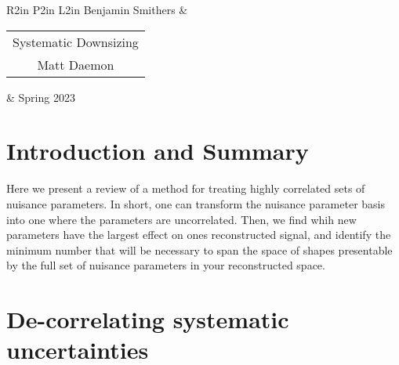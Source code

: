 \documentclass[12pt,a4paper]{article}
\begin{document}
\begin{table}
	\centering
	\begin{tabular}{R{2in} P{2in} L{2in}}
		Benjamin Smithers & \begin{tabular}{c}{\Large Systematic Downsizing} \\ {\Large Matt Daemon }  \end{tabular} & Spring 2023 \\\hline
	\end{tabular}

\end{table}

\section{Introduction and Summary}

Here we present a review of a method for treating highly correlated sets of nuisance parameters. In short, one can transform the nuisance parameter basis into one where the parameters are uncorrelated.
Then, we find whih new parameters have the largest effect on ones reconstructed signal, and identify the minimum number that will be necessary to span the space of shapes presentable by the full set of nuisance parameters in your reconstructed space. 

\section{De-correlating systematic uncertainties}\label{sec:decor}
\end{document}
